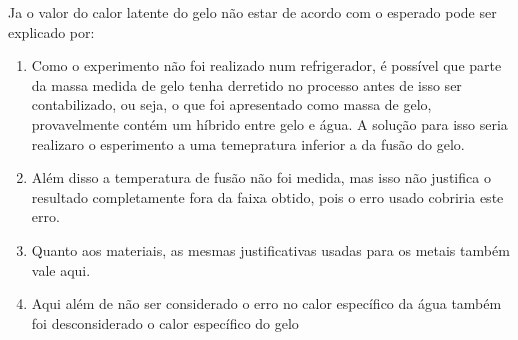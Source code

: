 \documentclass[a4paper]{article}
\begin{document}
		Ja o valor do calor latente do gelo não estar de acordo com o esperado
		pode ser explicado por:
		\begin{enumerate}
			\item Como o experimento não foi realizado num refrigerador, é possível
			que parte da massa medida de gelo tenha derretido no processo antes
			de isso ser contabilizado, ou seja, o que foi apresentado como massa
			de gelo, provavelmente contém um híbrido entre gelo e água. A solução
			para isso seria realizaro o esperimento a uma temepratura inferior
			a da fusão do gelo.
			\item Além disso a temperatura de fusão não foi medida, mas isso não justifica
			o resultado completamente fora da faixa obtido, pois o erro usado cobriria este
			erro.
			\item Quanto aos materiais, as mesmas justificativas usadas para os metais
			também vale aqui.
			\item Aqui além de não ser considerado o erro no calor específico da água
			também foi desconsiderado o calor específico do gelo
		\end{enumerate}
\end{document}
